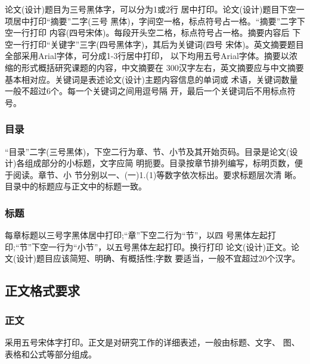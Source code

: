 \documentclass{SUFEThesis}
\begin{document}
论文(设计)题目为三号黑体字，可以分为1或2行 居中打印。论文(设计)题目下空一项居中打印“摘要”二字(三号 黑体)，字间空一格，标点符号占一格。“摘要”二字下空一行打印 内容(四号宋体)。每段开头空二格，标点符号占一格。摘要内容后 下空一行打印“关键字”三字(四号黑体字)，其后为关键词(四号 宋体)。英文摘要题目全部采用Arial字体，可分成1-3行居中打印， 以下均用五号Arial字体。摘要以浓缩的形式概括研究课题的内容，中文摘要在 300汉字左右，英文摘要应与中文摘要基本相对应。关键词是表述论文(设计)主题内容信息的单词或 术语，关键词数量一般不超过6个。每一个关键词之间用逗号隔 开，最后一个关键词后不用标点符号。

\subsubsection{目录}
“目录”二字(三号黑体)，下空二行为章、节、小节及其开始页码。目录是论文(设计)各组成部分的小标题，文字应简 明扼要。目录按章节排列编写，标明页数，便于阅读。章节、小 节分别以一、(一)1.(1)等数字依次标出。要求标题层次清 晰。目录中的标题应与正文中的标题一致。

\subsubsection{标题}
每章标题以三号字黑体居中打印;“章”下空二行为“节”，以四 号黑体左起打印;“节”下空一行为“小节”，以五号黑体左起打印。换行打印 论文(设计)正文。论文(设计)题目应该简短、明确、有概括性;字数 要适当，一般不宜超过20个汉字。

\subsection{正文格式要求}
\subsubsection{正文}
采用五号宋体字打印。正文是对研究工作的详细表述，一般由标题、文字、 图、表格和公式等部分组成。
\end{document}
